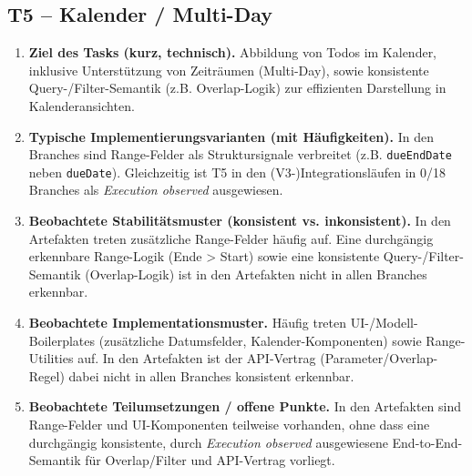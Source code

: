 \subsection*{T5 -- Kalender / Multi-Day}
\begin{enumerate}
  \item  \textbf{Ziel des Tasks (kurz, technisch).} Abbildung von Todos im Kalender, inklusive Unterstützung von Zeiträumen (Multi-Day), sowie konsistente Query-/Filter-Semantik (z.B. Overlap-Logik) zur effizienten Darstellung in Kalenderansichten.

  \item  \textbf{Typische Implementierungsvarianten (mit Häufigkeiten).} In den Branches sind Range-Felder als Struktursignale verbreitet (z.B. \texttt{dueEndDate} neben \texttt{dueDate}). Gleichzeitig ist T5 in den (V3-)Integrationsläufen in 0/18 Branches als \textit{Execution observed} ausgewiesen.

  \item  \textbf{Beobachtete Stabilitätsmuster (konsistent vs. inkonsistent).} In den Artefakten treten zusätzliche Range-Felder häufig auf. Eine durchgängig erkennbare Range-Logik (Ende > Start) sowie eine konsistente Query-/Filter-Semantik (Overlap-Logik) ist in den Artefakten nicht in allen Branches erkennbar.

  \item  \textbf{Beobachtete Implementationsmuster.} Häufig treten UI-/Modell-Boilerplates (zusätzliche Datumsfelder, Kalender-Komponenten) sowie Range-Utilities auf. In den Artefakten ist der API-Vertrag (Parameter/Overlap-Regel) dabei nicht in allen Branches konsistent erkennbar.

  \item  \textbf{Beobachtete Teilumsetzungen / offene Punkte.} In den Artefakten sind Range-Felder und UI-Komponenten teilweise vorhanden, ohne dass eine durchgängig konsistente, durch \textit{Execution observed} ausgewiesene End-to-End-Semantik für Overlap/Filter und API-Vertrag vorliegt.
\end{enumerate}
